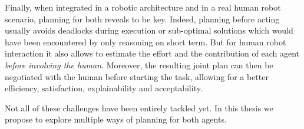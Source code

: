 \documentclass[a4paper,11pt,twoside]{StyleThese}
\begin{document}
Finally, when integrated in a robotic architecture and in a real human robot scenario, planning for both reveals to be key. Indeed, planning before acting usually avoids deadlocks during execution or sub-optimal solutions which would have been encountered by only reasoning on short term. But for human robot interaction it also allows to estimate the effort and the contribution of each agent \textit{before involving the human}. Moreover, the resulting joint plan can then be negotiated with the human before starting the task, allowing for a better efficiency, satisfaction, explainability and acceptability.

Not all of these challenges have been entirely tackled yet. In this thesis we propose to explore multiple ways of planning for both agents. 

\ifdefined{}
\else


\end{document}
